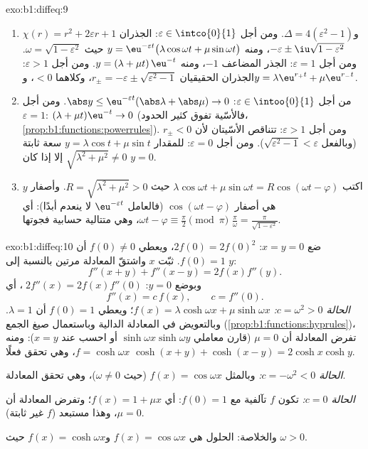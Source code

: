 \begin{solution}{exo:b1:diffeq:9}
\begin{enumerate}
  \item $\chi(r) = r^2 + 2\varepsilon r + 1$ و$\Delta = 4(\varepsilon^2
        - 1)$.
        ومن أجل $\varepsilon \in \intco{0}{1}$: الجذران $-\varepsilon \pm
        \iu\sqrt{1 - \varepsilon^2}$، ومنه
        $y = \eu^{-\varepsilon t}\bigl(\lambda\cos\omega t +
        \mu\sin\omega t\bigr)$ حيث $\omega = \sqrt{1 -
        \varepsilon^2}$.
        ومن أجل $\varepsilon = 1$: الجذر المضاعف $-1$، ومنه $y = (\lambda + \mu
        t)\,\eu^{-t}$.
        ومن أجل $\varepsilon > 1$: الجذران الحقيقيان $r_\pm = -\varepsilon \pm
        \sqrt{\varepsilon^2 - 1}$، وكلاهما $< 0$، و$y =
        \lambda\eu^{r_+t} + \mu\eu^{r_-t}$.
  \item من أجل $\varepsilon \in \intoo{0}{1}$: $\abs y \leq
        \eu^{-\varepsilon t}(\abs\lambda + \abs\mu) \to 0$. ومن أجل
        $\varepsilon = 1$: $(\lambda + \mu t)\eu^{-t} \to 0$
        (فالأسّية تفوق كثير الحدود،
        \cref{prop:b1:functions:powerrules}). ومن أجل $\varepsilon > 1$:
        تتناقص الأسّيتان لأن $r_\pm < 0$ (وبالفعل
        $\sqrt{\varepsilon^2 - 1} < \varepsilon$). ومن أجل $\varepsilon =
        0$: للمقدار $y = \lambda\cos t + \mu\sin t$ سعة ثابتة
        $\sqrt{\lambda^2 + \mu^2} \neq 0$ إلا إذا كان $y = 0$.
  \item اكتب $\lambda\cos\omega t + \mu\sin\omega t =
        R\cos(\omega t - \varphi)$ حيث $R = \sqrt{\lambda^2 + \mu^2}
        > 0$. وأصفار $y$ هي أصفار $\cos(\omega t -
        \varphi)$ (فالعامل $\eu^{-\varepsilon t}$ لا ينعدم
        أبدًا): أي $\omega t - \varphi \equiv \frac\pi2 \pmod \pi$،
        وهي متتالية حسابية فجوتها $\frac{\pi}{\omega} =
        \frac{\pi}{\sqrt{1 - \varepsilon^2}}$.
\end{enumerate}
\end{solution}

\begin{solution}{exo:b1:diffeq:10}
ضع $x = y = 0$: $2f(0) = 2f(0)^2$، ويعطي $f(0) \neq 0$ أن $f(0) =
1$. ثبّت $x$ واشتقّ المعادلة مرتين بالنسبة إلى $y$:
\[
f''(x+y) + f''(x-y) = 2 f(x) f''(y) .
\]
وبوضع $y = 0$: $\;2f''(x) = 2 f(x) f''(0)$، أي
\[
f''(x) = c\,f(x), \qquad c = f''(0).
\]
\emph{الحالة $c = \omega^2 > 0$:} $f(x) = \lambda\cosh\omega x +
\mu\sinh\omega x$؛ ويعطي $f(0) = 1$ أن $\lambda = 1$. وبالتعويض في
المعادلة الدالية وباستعمال صيغ الجمع
(\cref{prop:b1:functions:hyprules})، تفرض المعادلة أن $\mu = 0$
(قارن معاملي $\sinh\omega x \sinh\omega y$ أو
احسب عند $x = y$): ومنه $f = \cosh\omega x$، وهي تحقق فعلًا
$\cosh(x+y) + \cosh(x-y) = 2\cosh x\cosh y$.

\emph{الحالة $c = -\omega^2 < 0$:} وبالمثل $f(x) = \cos\omega x$
(حيث $\omega \neq 0$)، وهي تحقق المعادلة.

\emph{الحالة $c = 0$:} تكون $f$ تآلفية مع $f(0) = 1$: أي $f(x) = 1 + \mu x$؛
وتفرض المعادلة أن $\mu = 0$، وهذا مستبعد ($f$ غير ثابتة).

والخلاصة: الحلول هي $f(x) = \cos\omega x$ و$f(x) =
\cosh\omega x$ حيث $\omega > 0$.
\end{solution}

